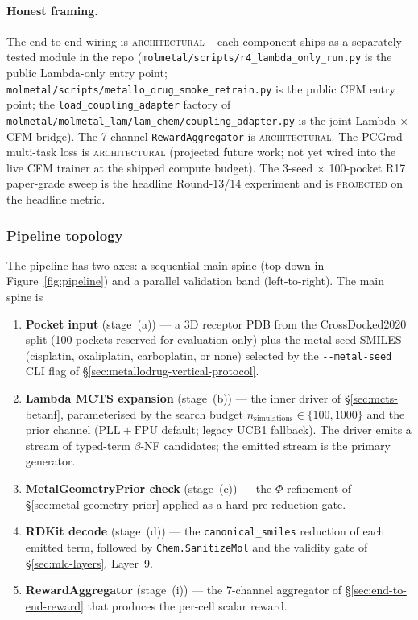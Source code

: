\paragraph{Honest framing.}
The end-to-end wiring is \textsc{architectural} -- each
component ships as a separately-tested module in the repo
(\texttt{molmetal/scripts/r4\_lambda\_only\_run.py} is the
public Lambda-only entry point;
\texttt{molmetal/scripts/metallo\_drug\_smoke\_retrain.py} is
the public CFM entry point; the
\texttt{load\_coupling\_adapter} factory of
\texttt{molmetal/molmetal\_lam/lam\_chem/coupling\_adapter.py}
is the joint Lambda $\times$ CFM bridge).  The 7-channel
\texttt{RewardAggregator} is \textsc{architectural}.  The
PCGrad multi-task loss is \textsc{architectural} (projected
future work; not yet wired into the live CFM trainer at the
shipped compute budget).  The 3-seed $\times$ 100-pocket
R17 paper-grade sweep is the headline Round-13/14
experiment and is \textsc{projected} on the headline metric.

\subsubsection{Pipeline topology}
\label{sec:end-to-end-topology}

The pipeline has two axes: a sequential main spine
(top-down in Figure~\ref{fig:pipeline}) and a parallel
validation band (left-to-right).  The main spine is

\begin{enumerate}
  \item \textbf{Pocket input} (stage~(a)) --- a 3D receptor
        PDB from the CrossDocked2020 split
        \cite{luo2021crossdocked} (100 pockets reserved for
        evaluation only) plus the metal-seed SMILES
        (cisplatin, oxaliplatin, carboplatin, or none)
        selected by the \texttt{-{}-metal-seed} CLI flag of
        \S\ref{sec:metallodrug-vertical-protocol}.

  \item \textbf{Lambda MCTS expansion} (stage~(b)) --- the
        inner driver of \S\ref{sec:mcts-betanf}, parameterised
        by the search budget $n_{\mathrm{simulations}} \in
        \{100, 1000\}$ and the prior channel
        ($\mathrm{PLL}+\mathrm{FPU}$ default; legacy UCB1
        fallback).  The driver emits a stream of typed-term
        $\beta$-NF candidates; the emitted stream is the
        primary generator.

  \item \textbf{MetalGeometryPrior check} (stage~(c)) --- the
        $\Phi$-refinement of \S\ref{sec:metal-geometry-prior}
        applied as a hard pre-reduction gate.

  \item \textbf{RDKit decode} (stage~(d)) --- the
        \texttt{canonical\_smiles} reduction of each emitted
        term, followed by \texttt{Chem.SanitizeMol} and the
        validity gate of \S\ref{sec:mlc-layers}, Layer~9.

  \item \textbf{RewardAggregator} (stage~(i)) --- the
        7-channel aggregator of \S\ref{sec:end-to-end-reward}
        that produces the per-cell scalar reward.
\end{enumerate}

